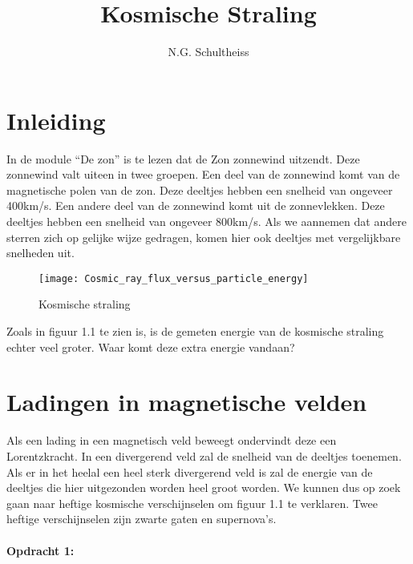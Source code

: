 



\title{Kosmische Straling}
\author{N.G. Schultheiss}
\date{}

\maketitle
\thispagestyle{firststyle}

\section{Inleiding}

In de module ``De zon'' is te lezen dat de Zon zonnewind uitzendt.
Deze zonnewind valt uiteen in twee groepen. Een deel van de zonnewind
komt van de magnetische polen van de zon. Deze deeltjes hebben een
snelheid van ongeveer 400km/s. Een andere deel van de zonnewind komt
uit de zonnevlekken. Deze deeltjes hebben een snelheid van ongeveer
800km/s. Als we aannemen dat andere sterren zich op gelijke wijze
gedragen, komen hier ook deeltjes met vergelijkbare snelheden uit.

\begin{figure}[h]
\noindent \begin{centering}
\texttt{[image: Cosmic\_ray\_flux\_versus\_particle\_energy]}
\par\end{centering}

\caption{Kosmische straling\cite{cosmicrayflux}}
\end{figure}


Zoals in figuur 1.1 te zien is, is de gemeten energie van de kosmische
straling echter veel groter. Waar komt deze extra energie vandaan?


\section{Ladingen in magnetische velden}

Als een lading in een magnetisch veld beweegt ondervindt deze een
Lorentzkracht. In een divergerend veld zal de snelheid van de deeltjes
toenemen. Als er in het heelal een heel sterk divergerend veld is
zal de energie van de deeltjes die hier uitgezonden worden heel groot
worden. We kunnen dus op zoek gaan naar heftige kosmische verschijnselen
om figuur 1.1 te verklaren. Twee heftige verschijnselen zijn zwarte
gaten en supernova's.


\paragraph*{Opdracht 1:}

